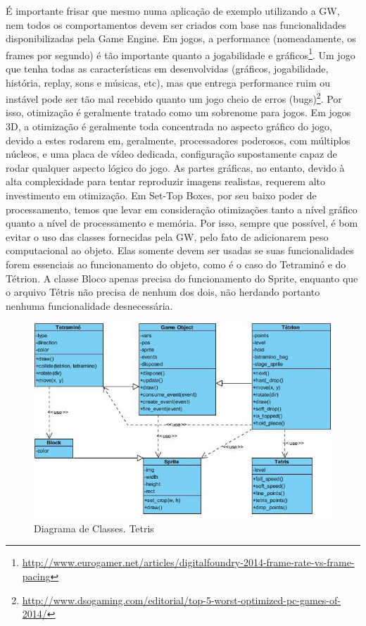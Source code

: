 \documentclass[
	12pt,				%
	openright,			%
	oneside,			%
	a4paper,			%
	brazil,				%
	]{abntex2}
\begin{document}
É importante frisar que mesmo numa aplicação de exemplo utilizando a GW, nem todos os comportamentos devem ser criados com base nas funcionalidades disponibilizadas pela Game Engine. Em jogos, a performance (nomeadamente, os frames por segundo) é tão importante quanto a jogabilidade e gráficos\footnote{\url{http://www.eurogamer.net/articles/digitalfoundry-2014-frame-rate-vs-frame-pacing}}. Um jogo que tenha todas as características em desenvolvidas (gráficos, jogabilidade, história, replay, sons e músicas, etc), mas que entrega performance ruim ou instável pode ser tão mal recebido quanto um jogo cheio de erros (bugs)\footnote{\url{http://www.dsogaming.com/editorial/top-5-worst-optimized-pc-games-of-2014/}}. Por isso, otimização é geralmente tratado como um sobrenome para jogos. Em jogos 3D, a otimização é geralmente toda concentrada no aspecto gráfico do jogo, devido a estes rodarem em, geralmente, processadores poderosos, com múltiplos núcleos, e uma placa de vídeo dedicada, configuração supostamente capaz de rodar qualquer aspecto lógico do jogo. As partes gráficas, no entanto, devido à alta complexidade para tentar reproduzir imagens realistas, requerem alto investimento em otimização. Em Set-Top Boxes, por seu baixo poder de processamento, temos que levar em consideração otimizações tanto a nível gráfico quanto a nível de processamento e memória. Por isso, sempre que possível, é bom evitar o uso das classes fornecidas pela GW, pelo fato de adicionarem peso computacional ao objeto. Elas somente devem ser usadas se suas funcionalidades forem essenciais ao funcionamento do objeto, como é o caso do Tetraminó e do Tétrion. A classe Bloco apenas precisa do funcionamento do Sprite, enquanto que o arquivo Tétris não precisa de nenhum dos dois, não herdando portanto nenhuma funcionalidade desnecessária.

\begin{figure}
\centering
\includegraphics{tetris_dia_classes.jpg}
\caption{Diagrama de Classes. Tetris}
\label{fig:diagramaClassesTetris}
\end{figure}
\end{document}
